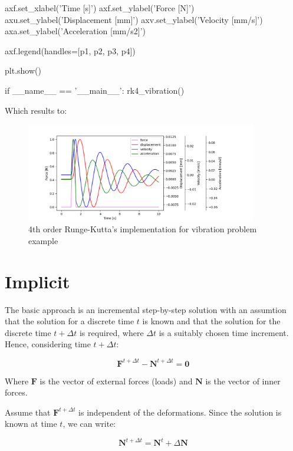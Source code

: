 \documentclass[10pt,b5paper,titlepage]{book}
\newcommand{\m}{\mathbf}
\begin{document}
\begin{python}
    axf.set_xlabel('Time [s]')
    axf.set_ylabel('Force [N]')
    axu.set_ylabel('Displacement [mm]')
    axv.set_ylabel('Velocity [mm/s]')
    axa.set_ylabel('Acceleration [mm/s2]')

    axf.legend(handles=[p1, p2, p3, p4])

    plt.show()

if __name__ == '__main__':
    rk4_vibration()

\end{python}

Which results to:
\begin{figure}[ht]
    \centering
    \includegraphics[width=0.90\textwidth]{img/rk4_example.png}
    \caption{4th order Runge-Kutta's implementation for vibration problem example}
    \label{fig:rk4-example-png}
\end{figure}



\newpage
\section{Implicit}

The basic approach is an incremental step-by-step solution with an assumtion
that the solution for a discrete time $ t $ is known and that the solution for
the discrete time $ t + \Delta t $ is required, where $ \Delta t $ is
a suitably chosen time increment. Hence, considering time $ t + \Delta t $:

\begin{equation}\label{implicit-equation}
    \m{F}^{t + \Delta t} - \m{N}^{t + \Delta t} = \m{0}
\end{equation}

Where $ \m{F} $ is the vector of external forces (loads) and $ \m{N} $
is the vector of inner forces.

Assume that $ \m{F}^{t + \Delta t} $ is independent of the deformations.
Since the solution is known at time $ t $, we can write:

\begin{equation}
    \m{N}^{t+\Delta t} = \m{N}^t + \Delta \m{N}
\end{equation}
\end{document}
